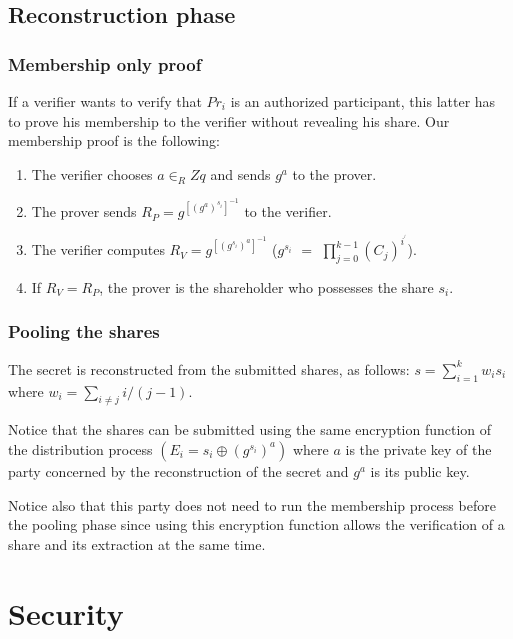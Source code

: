 \documentclass[submission,copyright,creativecommons]{eptcs}
\begin{document}
\subsection{Reconstruction phase}

\subsubsection{Membership only proof}

If a verifier wants to verify that $Pr_{i}$ is an authorized participant,
this latter has to prove his membership to the verifier without revealing
his share. Our membership proof is the following:

\begin{enumerate}
\item The verifier chooses $a\in _{R}Zq$ and sends $g^{a}$ to the prover.

\item The prover sends $R_{P}=g^{[(g^{a})^{s_{i}}]^{-1}}$ to the verifier.

\item The verifier computes $R_{V}=g^{[(g^{s_{i}})^{a}]^{-1}}$ ($g^{s_{i}}$ $=$ $\prod_{j=0}^{k-1}(C_{j})^{i^{^{_{j}}}}$).

\item If $R_{V}=R_{P}$, the prover is the shareholder who possesses the
share $s_{i}$.
\end{enumerate}

\subsubsection{Pooling the shares}

The secret is reconstructed from the submitted shares, as follows: $s=\sum_{i=1}^{k}w_{i}s_{i}$ where $w_{i}=\sum_{i\neq j}i/(j-1)$.

Notice that the shares can be submitted using the same encryption function
of the distribution process $(E_{i}=s_{i}\oplus (g^{s_{i}})^{a})$ where $a$
is the private key of the party concerned by the reconstruction of the
secret and $g^{a}$ is its public key.

Notice also that this party does not need to run the membership process
before the pooling phase since using this encryption function allows the
verification of a share and its extraction at the same time.

\section{Security}
\end{document}
